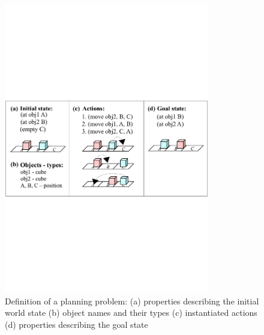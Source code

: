 \begin{figure}[h]
	\centering
	\includegraphics[width=0.8\textwidth]{figures/planning-permutation-01}
	\caption{Definition of a planning problem: (a) properties describing the initial world state (b) object names and their types (c) instantiated actions (d) properties describing the goal state}
	\label{fig:planning problem}
\end{figure}


